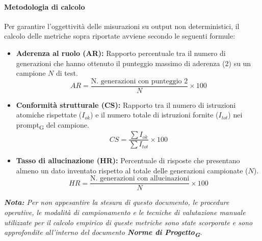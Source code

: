 \documentclass[11pt,a4paper]{article}
\newcommand{\gls}[1]{#1\textsubscript{G}}
\begin{document}
\paragraph{Metodologia di calcolo}
Per garantire l'oggettività delle misurazioni su output non deterministici, il calcolo delle metriche sopra riportate avviene secondo le seguenti formule:

\begin{itemize}
    \item \textbf{Aderenza al ruolo (AR):} Rapporto percentuale tra il numero di generazioni che hanno ottenuto il punteggio massimo di aderenza (2) su un campione $N$ di test.
    \begin{displaymath}
        AR = \frac{\text{N. generazioni con punteggio 2}}{N} \times 100
    \end{displaymath}

    \item \textbf{Conformità strutturale (CS):} Rapporto tra il numero di istruzioni atomiche rispettate ($I_{ok}$) e il numero totale di istruzioni fornite ($I_{tot}$) nei \gls{prompt} del campione.
    \begin{displaymath}
        CS = \frac{\sum I_{ok}}{\sum I_{tot}} \times 100
    \end{displaymath}

    \item \textbf{Tasso di allucinazione (HR):} Percentuale di risposte che presentano almeno un dato inventato rispetto al totale delle generazioni campionate ($N$).
    \begin{displaymath}
        HR = \frac{\text{N. generazioni con allucinazioni}}{N} \times 100
    \end{displaymath}
\end{itemize}


\noindent\textit{\textbf{Nota:} Per non appesantire la stesura di questo documento, le procedure operative, le modalità di campionamento e le tecniche di valutazione manuale utilizzate per il calcolo empirico di queste metriche sono state scorporate e sono approfondite all'interno del documento \textbf{\gls{Norme di Progetto}}.}
\end{document}
